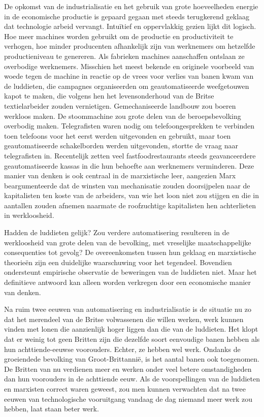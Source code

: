 De opkomst van de industrialisatie en het gebruik van grote hoeveelheden energie in de economische productie is gepaard gegaan met steeds terugkerend geklaag dat technologie arbeid vervangt. Intuïtief en oppervlakkig gezien lijkt dit logisch. Hoe meer machines worden gebruikt om de productie en productiviteit te verhogen, hoe minder producenten afhankelijk zijn van werknemers om hetzelfde productieniveau te genereren. Als fabrieken machines aanschaffen ontslaan ze overbodige werknemers. Misschien het meest bekende en originele voorbeeld van woede tegen de machine in reactie op de vrees voor verlies van banen kwam van de luddieten, die campagnes organiseerden om geautomatiseerde weefgetouwen kapot te maken, die volgens hen het levensonderhoud van de Britse textielarbeider zouden vernietigen. Gemechaniseerde landbouw zou boeren werkloos maken. De stoommachine zou grote delen van de beroepsbevolking overbodig maken. Telegrafisten waren nodig om telefoongesprekken te verbinden toen telefoons voor het eerst werden uitgevonden en gebruikt, maar toen geautomatiseerde schakelborden werden uitgevonden, stortte de vraag naar telegrafisten in. Recentelijk zetten veel fastfoodrestaurants steeds geavanceerdere geautomatiseerde kassa\textquotesingle s in die hun behoefte aan werknemers verminderen. Deze manier van denken is ook centraal in de marxistische leer, aangezien Marx beargumenteerde dat de winsten van mechanisatie zouden doorsijpelen naar de kapitalisten ten koste van de arbeiders, van wie het loon niet zou stijgen en die in aantallen zouden afnemen naarmate de roofzuchtige kapitalisten hen achterlieten in werkloosheid.

Hadden de luddieten gelijk? Zou verdere automatisering resulteren in de werkloosheid van grote delen van de bevolking, met vreselijke maatschappelijke consequenties tot gevolg? De overeenkomsten tussen hun geklaag en marxistische theorieën zijn een duidelijke waarschuwing voor het tegendeel. Bovendien ondersteunt empirische observatie de beweringen van de luddieten niet. Maar het definitieve antwoord kan alleen worden verkregen door een economische manier van denken.

Na ruim twee eeuwen van automatisering en industrialisatie is de situatie nu zo dat het merendeel van de Britse volwassenen die willen werken, werk kunnen vinden met lonen die aanzienlijk hoger liggen dan die van de luddieten. Het klopt dat er weinig tot geen Britten zijn die dezelfde soort eenvoudige banen hebben als hun achttiende-eeuwse voorouders. Echter, ze hebben wel werk. Ondanks de groeiendede bevolking van Groot-Brittannië, is het aantal banen ook toegenomen. De Britten van nu verdienen meer en werken onder veel betere omstandigheden dan hun voorouders in de achttiende eeuw. Als de voorspellingen van de luddieten en marxisten correct waren geweest, zou men kunnen verwachten dat na twee eeuwen van technologische vooruitgang vandaag de dag niemand meer werk zou hebben, laat staan beter werk.

